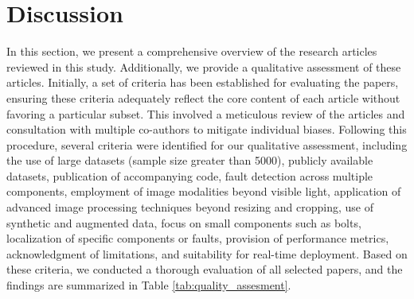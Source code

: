 \section{Discussion}\label{sec:discussion}

In this section, we present a comprehensive overview of the research articles reviewed in this study. Additionally, we provide a qualitative assessment of these articles. Initially, a set of criteria has been established for evaluating the papers, ensuring these criteria adequately reflect the core content of each article without favoring a particular subset. This involved a meticulous review of the articles and consultation with multiple co-authors to mitigate individual biases. Following this procedure, several criteria were identified for our qualitative assessment, including the use of large datasets (sample size greater than 5000), publicly available datasets, publication of accompanying code, fault detection across multiple components, employment of image modalities beyond visible light, application of advanced image processing techniques beyond resizing and cropping, use of synthetic and augmented data, focus on small components such as bolts, localization of specific components or faults, provision of performance metrics, acknowledgment of limitations, and suitability for real-time deployment. Based on these criteria, we conducted a thorough evaluation of all selected papers, and the findings are summarized in Table \ref{tab:quality_assesment}.

